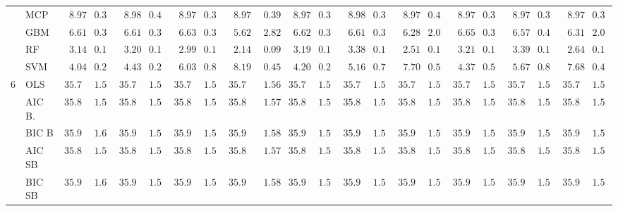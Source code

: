 \begin{tabular}{ll|ll|llllll|llllll|llllll}
	& MCP  & $\phantom{0}8.97$ & $0.39$ & $\phantom{0}8.98$ & $0.40$ & $\phantom{0}8.97$ & $0.39$ & $\phantom{0}8.97$ & $\phantom{0}0.39$ & $\phantom{0}8.97$ & $0.39$ & $\phantom{0}8.98$ & $0.39$ & $\phantom{0}8.97$ & $0.40$ & $\phantom{0}8.97$ & $0.39$ & $\phantom{0}8.97$ & $0.39$ & $\phantom{0}8.97$ & $0.39$ \\
	& GBM  & $\phantom{0}6.61$ & $0.34$ & $\phantom{0}6.61$ & $0.34$ & $\phantom{0}6.63$ & $0.38$ & $\phantom{0}5.62$ & $\phantom{0}2.82$ & $\phantom{0}6.62$ & $0.33$ & $\phantom{0}6.61$ & $0.38$ & $\phantom{0}6.28$ & $2.09$ & $\phantom{0}6.65$ & $0.34$ & $\phantom{0}6.57$ & $0.41$ & $\phantom{0}6.31$ & $2.09$ \\
	& RF  & $\phantom{0}3.14$ & $0.13$ & $\phantom{0}3.20$ & $0.14$ & $\phantom{0}2.99$ & $0.14$ & $\phantom{0}2.14$ & $\phantom{0}0.09$ & $\phantom{0}3.19$ & $0.12$ & $\phantom{0}3.38$ & $0.13$ & $\phantom{0}2.51$ & $0.11$ & $\phantom{0}3.21$ & $0.13$ & $\phantom{0}3.39$ & $0.14$ & $\phantom{0}2.64$ & $0.12$ \\
	& SVM  & $\phantom{0}4.04$ & $0.26$ & $\phantom{0}4.43$ & $0.28$ & $\phantom{0}6.03$ & $0.86$ & $\phantom{0}8.19$ & $\phantom{0}0.45$ & $\phantom{0}4.20$ & $0.27$ & $\phantom{0}5.16$ & $0.79$ & $\phantom{0}7.70$ & $0.53$ & $\phantom{0}4.37$ & $0.50$ & $\phantom{0}5.67$ & $0.88$ & $\phantom{0}7.68$ & $0.47$ \\\hline
	6 & OLS  & $35.73$ & $1.56$ & $35.73$ & $1.56$ & $35.73$ & $1.56$ & $35.73$ & $\phantom{0}1.56$ & $35.73$ & $1.56$ & $35.73$ & $1.56$ & $35.73$ & $1.56$ & $35.73$ & $1.56$ & $35.73$ & $1.56$ & $35.73$ & $1.56$ \\
	& AIC B.  & $35.83$ & $1.56$ & $35.82$ & $1.56$ & $35.82$ & $1.56$ & $35.84$ & $\phantom{0}1.57$ & $35.83$ & $1.57$ & $35.82$ & $1.56$ & $35.82$ & $1.56$ & $35.83$ & $1.56$ & $35.82$ & $1.56$ & $35.83$ & $1.56$ \\
	& BIC B  & $35.95$ & $1.60$ & $35.95$ & $1.57$ & $35.94$ & $1.57$ & $35.93$ & $\phantom{0}1.58$ & $35.93$ & $1.57$ & $35.95$ & $1.57$ & $35.93$ & $1.57$ & $35.94$ & $1.58$ & $35.95$ & $1.57$ & $35.95$ & $1.57$ \\
	& AIC SB  & $35.83$ & $1.56$ & $35.82$ & $1.56$ & $35.82$ & $1.56$ & $35.84$ & $\phantom{0}1.57$ & $35.83$ & $1.57$ & $35.82$ & $1.56$ & $35.82$ & $1.56$ & $35.83$ & $1.56$ & $35.82$ & $1.56$ & $35.83$ & $1.56$ \\
	& BIC SB  & $35.95$ & $1.60$ & $35.95$ & $1.57$ & $35.94$ & $1.57$ & $35.93$ & $\phantom{0}1.58$ & $35.93$ & $1.57$ & $35.95$ & $1.57$ & $35.93$ & $1.57$ & $35.94$ & $1.58$ & $35.95$ & $1.57$ & $35.95$ & $1.57$ \\

\end{tabular}
